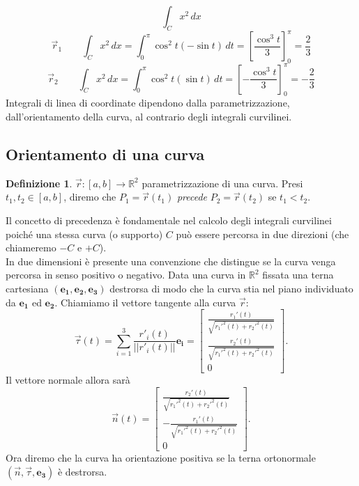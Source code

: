 \documentclass[10pt]{article}
\theoremstyle{plain}
\theoremstyle{definition}
\newtheorem{defn}{Definizione}
\begin{document}
$$\int_C x^2\,dx$$
$$\vec{r}_1 \qquad \int_C x^2\,dx = \int_0^{\pi} \cos ^2 t (-\sin t) \,dt =\left[ \frac{\cos ^3 t}{3} \right]_0^{\pi} =\frac{2}{3}$$
$$\vec{r}_2 \qquad \int_C x^2\,dx = \int_0^{\pi} \cos ^2 t (\sin t) \,dt =\left[ -\frac{\cos ^3 t}{3} \right]_0^{\pi} =-\frac{2}{3}$$
Integrali di linea di coordinate dipendono dalla parametrizzazione, dall'orientamento della curva, al contrario degli integrali curvilinei.

\subsection{Orientamento di una curva}
\begin{defn}
$\vec{r}:[a,b]\to \mathbb{R}^2$ parametrizzazione di una curva. Presi $t_1, t_2 \in [a,b]$, diremo che $P_1=\vec{r}(t_1)$ \textit{precede} $P_2=\vec{r}(t_2)$ se $t_1<t_2$.
\end{defn}
Il concetto di precedenza è fondamentale nel calcolo degli integrali curvilinei poiché una stessa curva (o supporto) $C$ può essere percorsa in due direzioni (che chiameremo $-C$ e $+C$). 
\\ In due dimensioni è presente una convenzione che distingue se la curva venga percorsa in senso positivo o negativo. Data una curva in $\mathbb{R}^2$ fissata una terna cartesiana $(\mathbf{e_1}, \mathbf{e_2}, \mathbf{e_3})$ destrorsa di modo che la curva stia nel piano individuato da $\mathbf{e_1}$ ed $\mathbf{e_2}$. Chiamiamo il vettore tangente alla curva $\vec{r}$:
$$\vec{\tau}(t)=\sum_{i=1}^3\frac{r'_i(t)}{||r'_i(t)||}\mathbf{e_i}=\begin{bmatrix}
\frac{r_1'(t)}{\sqrt{r_1'^2(t)+r_2'^2(t)}}
\\
\frac{r_2'(t)}{\sqrt{r_1'^2(t)+r_2'^2(t)}}
\\
0
\end{bmatrix}.
$$
Il vettore normale allora sarà
$$\vec{n}(t)=\begin{bmatrix}
\frac{r_2'(t)}{\sqrt{r_1'^2(t)+r_2'^2(t)}}
\\
-\frac{r_1'(t)}{\sqrt{r_1'^2(t)+r_2'^2(t)}}
\\
0
\end{bmatrix}.
$$
Ora diremo che la curva ha orientazione positiva se la terna ortonormale $(\vec{n}, \vec{\tau}, \mathbf{e_3})$ è destrorsa.
\end{document}
